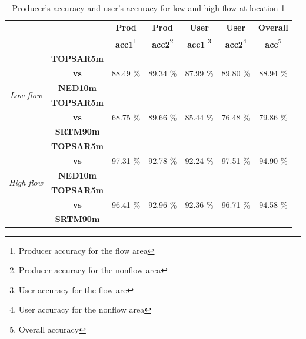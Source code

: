 \documentclass[12pt,letterpaper]{article}
\begin{document}
  \begin{table} [H]
    \caption{Producer's accuracy and user's accuracy for low and high flow at location 1}\label{tab:Table5}
    \begin{minipage}{16cm}
      \begin{tabular}{ccccccc}
        \hline
        &&\textbf{Prod}&\textbf{Prod}
        &\textbf{User }&\textbf{User }&
        \textbf{Overall } \\
  
        &&\textbf{acc1}\footnote{Producer accuracy for the flow area}&\textbf{acc2}\footnote{Producer accuracy for the nonflow area}
        &\textbf{acc1} \footnote{User accuracy for the flow are}&\textbf{acc2}\footnote{User accuracy for the nonflow area}&
        \textbf{acc}\footnote{Overall accuracy} \\ \hline
        \multirow{6}{*}{\textit{Low flow}}&\textbf{TOPSAR5m}&&&&&\\
        &\textbf{vs} &88.49 \%&89.34 \%& 87.99 \%& 89.80 \%&88.94 \% \\ 
        &\textbf{NED10m}&&&&&\\
        &\textbf{TOPSAR5m }&&&&&\\
        &\textbf{vs} &68.75 \% &89.66 \% & 85.44 \% & 76.48 \%&79.86 \% \\
        &\textbf{SRTM90m}&&&&&\\	
        \hline
        \hline
        \multirow{6}{*}{\textit{High flow}}&\textbf{TOPSAR5m}&&&&&\\
        &\textbf{vs} &97.31 \%&92.78 \%& 92.24 \%& 97.51 \%&94.90 \% \\
        &\textbf{NED10m}&&&&&\\
        &\textbf{TOPSAR5m }&&&&&\\
        &\textbf{vs}&96.41 \% &92.96 \% & 92.36 \% & 96.71 \%&94.58 \% \\   
        &\textbf{SRTM90m}&&&&&\\
        \hline
      \end{tabular}\par
      \vspace{-0.75\skip\footins} \renewcommand{\footnoterule}{}
    \end{minipage}
  \end{table}
\end{document}
